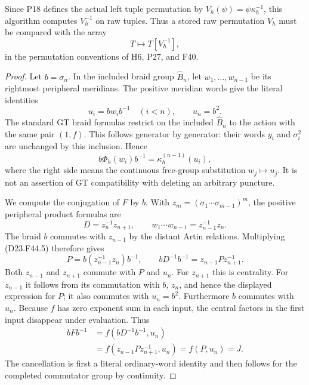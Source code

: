 Since P18 defines the actual left tuple permutation by
$V_h(\psi)=\psi\kappa_h^{-1}$, this algorithm computes
$V_h^{-1}$ on raw tuples. Thus a stored raw permutation
$V_h$ must be compared with the array
\[
                  T\longmapsto T[V_h^{-1}],
                                                        \tag{D23.F44.4}
\]
in the permutation conventions of H6, P27, and F40.

\begin{proof}
Let $b=\sigma_n$. In the included braid group
$\widehat B_n$, let $w_1,\ldots,w_{n-1}$ be its rightmost
peripheral meridians. The positive meridian words give
the literal identities
\[
 u_i=bw_i b^{-1}\quad(i<n),\qquad u_n=b^2.
                                                        \tag{D23.F44.5}
\]
The standard GT braid formulas restrict on the included
$\widehat B_n$ to the action with the same pair $(1,f)$.
This follows generator by generator: their words $y_i$
and $\sigma_i^2$ are unchanged by this inclusion. Hence
\[
 b\Phi_h(w_i)b^{-1}
       =\kappa_h^{(n-1)}(u_i),
                                                        \tag{D23.F44.6}
\]
where the right side means the continuous free-group
substitution $w_j\mapsto u_j$. It is not an assertion of
GT compatibility with deleting an arbitrary puncture.

We compute the conjugation of $F$ by $b$. With
$z_m=(\sigma_1\cdots\sigma_{m-1})^m$, the positive peripheral
product formulas are
\[
 D=z_n^{-1}z_{n+1},\qquad
 w_1\cdots w_{n-1}=z_{n-1}^{-1}z_n.
\]
The braid $b$ commutes with $z_{n-1}$ by the distant Artin
relations. Multiplying (D23.F44.5) therefore gives
\[
 P=b(z_{n-1}^{-1}z_n)b^{-1},\qquad
 bD^{-1}b^{-1}=z_{n-1}Pz_{n+1}^{-1}.
                                                        \tag{D23.F44.7}
\]
Both $z_{n-1}$ and $z_{n+1}$ commute with $P$ and $u_n$.
For $z_{n+1}$ this is centrality. For $z_{n-1}$ it follows
from its commutation with $b$, $z_n$, and hence the displayed
expression for $P$; it also commutes with $u_n=b^2$.
Furthermore $b$ commutes with $u_n$. Because $f$ has zero
exponent sum in each input, the central factors in the
first input disappear under evaluation. Thus
\[
\begin{split}
 bF b^{-1}
   &=f(bD^{-1}b^{-1},u_n)\\
   &=f(z_{n-1}Pz_{n+1}^{-1},u_n)
     =f(P,u_n)=J.
\end{split}
                                                        \tag{D23.F44.8}
\]
The cancellation is first a literal ordinary-word identity
and then follows for the completed commutator group by
continuity.


\end{proof}
